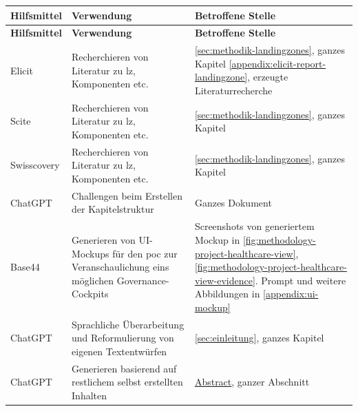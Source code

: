 \begin{longtable}{|
  L{3cm}|
  p{\dimexpr(\textwidth-3cm-6\arrayrulewidth)/2}|
  p{\dimexpr(\textwidth-3cm-6\arrayrulewidth)/2}|
}
    \hline
    \textbf{Hilfsmittel} & \textbf{Verwendung} & \textbf{Betroffene Stelle} \\
    \hline
    \endfirsthead

    \hline
    \textbf{Hilfsmittel} & \textbf{Verwendung} & \textbf{Betroffene Stelle} \\
    \hline
    \endhead

    Elicit &
    Recherchieren von Literatur zu \ac{lz}, Komponenten etc. & 
    \autoref{sec:methodik-landingzones}, ganzes Kapitel \newline
    \autoref{appendix:elicit-report-landingzone}, erzeugte Literaturrecherche \newline
    \\
    \hline
        
    Scite &
    Recherchieren von Literatur zu \ac{lz}, Komponenten etc. &
    \autoref{sec:methodik-landingzones}, ganzes Kapitel
    \\
    \hline

    Swisscovery & 
    Recherchieren von Literatur zu \ac{lz}, Komponenten etc. & 
    \autoref{sec:methodik-landingzones}, ganzes Kapitel
    \\
    \hline

    ChatGPT &
    Challengen beim Erstellen der Kapitelstruktur & 
    Ganzes Dokument
    \\
    \hline

    Base44 &
    Generieren von UI-Mockups für den \ac{poc} zur Veranschaulichung eins möglichen Governance-Cockpits &
    Screenshots von generiertem Mockup in \autoref{fig:methodology-project-healthcare-view}, \autoref{fig:methodology-project-healthcare-view-evidence}. \newline Prompt und weitere Abbildungen in \autoref{appendix:ui-mockup}
    \\
    \hline

    ChatGPT &
    Sprachliche Überarbeitung und Reformulierung von eigenen Textentwürfen &
    \autoref{sec:einleitung}, ganzes Kapitel
    \\
    \hline

    ChatGPT &
    Generieren basierend auf restlichem selbst erstellten Inhalten & 
    \hyperlink{link:abstract}{Abstract}, ganzer Abschnitt
    \\
    \hline


\end{longtable}
